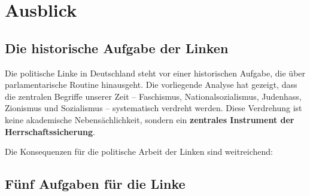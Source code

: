 \section{Ausblick}

\subsection{Die historische Aufgabe der Linken}

Die politische Linke in Deutschland steht vor einer historischen Aufgabe, die über parlamentarische Routine hinausgeht. Die vorliegende Analyse hat gezeigt, dass die zentralen Begriffe unserer Zeit -- Faschismus, Nationalsozialismus, Judenhass, Zionismus und Sozialismus -- systematisch verdreht werden. Diese Verdrehung ist keine akademische Nebensächlichkeit, sondern ein \textbf{zentrales Instrument der Herrschaftssicherung}.

Die Konsequenzen für die politische Arbeit der Linken sind weitreichend:

\subsection{Fünf Aufgaben für die Linke}

